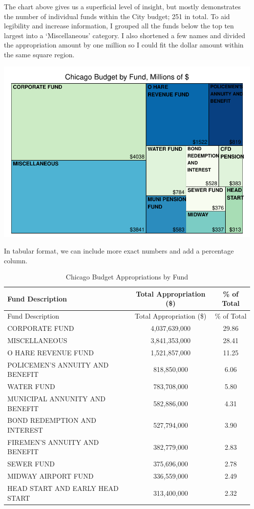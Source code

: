 \documentclass[
]{article}
\begin{document}
The chart above gives us a superficial level of insight, but mostly
demonstrates the number of individual funds within the City budget; 251
in total. To aid legibility and increase information, I grouped all the
funds below the top ten largest into a `Miscellaneous' category. I also
shortened a few names and divided the appropriation amount by one
million so I could fit the dollar amount within the same square region.

\begin{center}\includegraphics{cpd_budget_analysis_files/figure-latex/reduced budget treemap-1} \end{center}

In tabular format, we can include more exact numbers and add a
percentage column.

\begin{longtable}[]{@{}lcc@{}}
\caption{Chicago Budget Appropriations by Fund}\tabularnewline
\toprule
Fund Description & Total Appropriation (\$) & \% of Total\tabularnewline
\midrule
\endfirsthead
\toprule
Fund Description & Total Appropriation (\$) & \% of Total\tabularnewline
\midrule
\endhead
CORPORATE FUND & 4,037,639,000 & 29.86\tabularnewline
MISCELLANEOUS & 3,841,353,000 & 28.41\tabularnewline
O HARE REVENUE FUND & 1,521,857,000 & 11.25\tabularnewline
POLICEMEN'S ANNUITY AND BENEFIT & 818,850,000 & 6.06\tabularnewline
WATER FUND & 783,708,000 & 5.80\tabularnewline
MUNICIPAL ANNUNITY AND BENEFIT & 582,886,000 & 4.31\tabularnewline
BOND REDEMPTION AND INTEREST & 527,794,000 & 3.90\tabularnewline
FIREMEN'S ANNUITY AND BENEFIT & 382,779,000 & 2.83\tabularnewline
SEWER FUND & 375,696,000 & 2.78\tabularnewline
MIDWAY AIRPORT FUND & 336,559,000 & 2.49\tabularnewline
HEAD START AND EARLY HEAD START & 313,400,000 & 2.32\tabularnewline
\bottomrule
\end{longtable}
\end{document}
